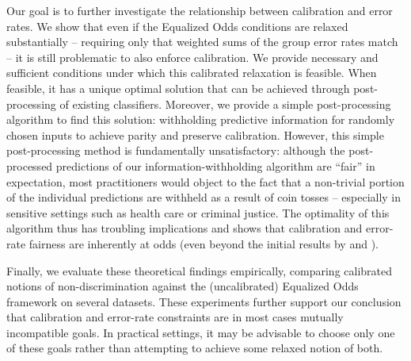 Our goal is to further investigate the relationship between calibration and error rates.
We show that even if the Equalized Odds conditions are relaxed
substantially -- requiring only that weighted sums of the group error
rates match -- it is still problematic to also enforce calibration.
We provide necessary and sufficient conditions under which this calibrated
relaxation
is feasible.
When feasible, it has a unique optimal solution that
can be achieved through post-processing of existing classifiers.
%
Moreover, we provide a simple post-processing algorithm to find this solution:
withholding predictive information for randomly chosen inputs
to achieve parity and preserve calibration. However, this simple
post-processing method is fundamentally unsatisfactory: although the
post-processed predictions of our information-withholding algorithm are ``fair'' in
expectation, most practitioners would object to the fact that a non-trivial
portion of the individual predictions are withheld as a result of coin tosses -- especially in
sensitive settings such as health care or criminal justice. The
optimality of this algorithm thus has troubling implications and shows that
calibration and error-rate fairness are inherently at odds (even beyond the initial results
by \cite{chouldechova2017fair} and \cite{kleinberg2016inherent}).

Finally, we evaluate these theoretical findings empirically,
comparing calibrated notions of non-discrimination against
the (uncalibrated) Equalized Odds framework on several datasets.
These experiments further support our conclusion that calibration and error-rate constraints are in most cases mutually incompatible goals.
In practical settings, it may be advisable to choose only one of these goals rather than attempting to achieve some relaxed notion of both.



